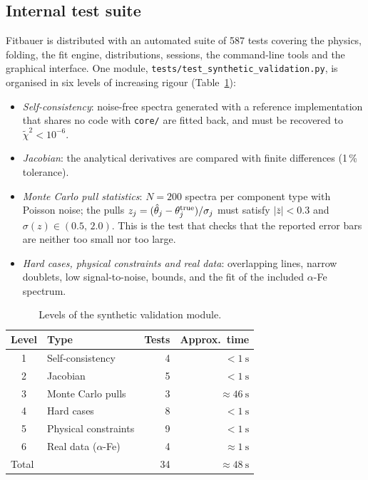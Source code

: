 \documentclass[smallcondensed]{svjour3}
\begin{document}
\subsection{Internal test suite}

Fitbauer is distributed with an automated suite of 587 tests covering the
physics, folding, the fit engine, distributions, sessions, the
command-line tools and the graphical interface. One module,
\texttt{tests/test\_synthetic\_validation.py}, is organised in six levels
of increasing rigour (Table~\ref{tab:validation}):
\begin{itemize}
  \item \emph{Self-consistency}: noise-free spectra generated with a
    reference implementation that shares no code with \texttt{core/} are
    fitted back, and must be recovered to $\tilde{\chi}^2 < 10^{-6}$.
  \item \emph{Jacobian}: the analytical derivatives are compared with
    finite differences (1\,\% tolerance).
  \item \emph{Monte Carlo pull statistics}: $N=200$ spectra per component
    type with Poisson noise; the pulls
    $z_j = (\hat{\theta}_j - \theta_j^{\rm true})/\sigma_j$ must satisfy
    $|\bar{z}| < 0.3$ and $\sigma(z) \in (0.5,\,2.0)$. This is the test
    that checks that the reported error bars are neither too small nor
    too large.
  \item \emph{Hard cases, physical constraints and real data}: overlapping
    lines, narrow doublets, low signal-to-noise, bounds, and the fit of the
    included $\alpha$-Fe spectrum.
\end{itemize}

\begin{table}[t]
  \caption{Levels of the synthetic validation module.}
  \label{tab:validation}
  \centering
  \begin{tabular}{clrr}
    \toprule
    Level & Type & Tests & Approx.\ time \\
    \midrule
    1 & Self-consistency       &  4 & $<\SI{1}{\second}$   \\
    2 & Jacobian               &  5 & $<\SI{1}{\second}$   \\
    3 & Monte Carlo pulls      &  3 & $\approx\SI{46}{\second}$ \\
    4 & Hard cases             &  8 & $<\SI{1}{\second}$   \\
    5 & Physical constraints   &  9 & $<\SI{1}{\second}$   \\
    6 & Real data ($\alpha$-Fe)&  4 & $\approx\SI{1}{\second}$ \\
    \midrule
    \multicolumn{2}{l}{Total} & 34 & $\approx\SI{48}{\second}$ \\
    \bottomrule
  \end{tabular}
\end{table}
\end{document}
